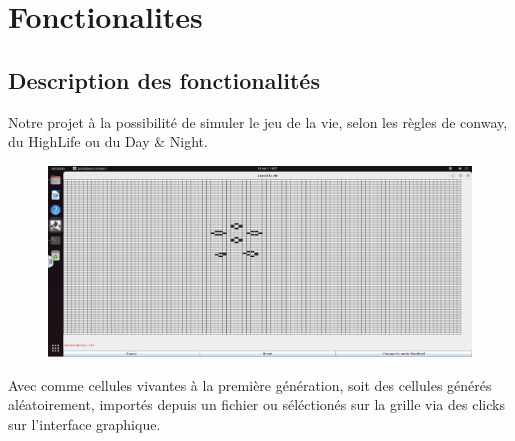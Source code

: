 
\section{Fonctionalites}
\subsection{Description des fonctionalités}

         Notre projet à la possibilité de simuler le jeu de la vie, selon les règles de conway, du HighLife ou du Day \& Night. 
         \begin{figure}


 \begin{center}
    \includegraphics[width=120mm,scale=0.5]{figures/jeu.png}
 \end{center}
         \end{figure}
    Avec comme cellules vivantes à la première génération, soit des cellules générés aléatoirement, importés depuis un fichier ou séléctionés sur la grille via des clicks sur l'interface graphique.
